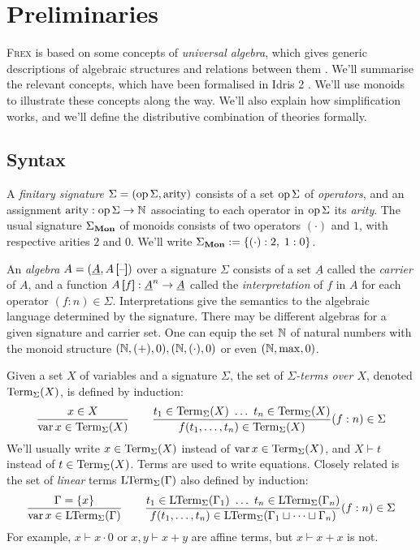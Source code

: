 \section{Preliminaries}
\label{sec:preliminaries}

\textsc{Frex} is based on some concepts of \emph{universal algebra}, which gives generic descriptions of algebraic structures and relations between them \parencite[][Chp. II]{universal_algebra}. We'll summarise the relevant concepts, which have been formalised in Idris 2 \parencite{idris_frex}. We'll use monoids to illustrate these concepts along the way. We'll also explain how simplification works, and we'll define the distributive combination of theories formally.

\subsection{Syntax}

A \emph{finitary signature} $\Sigma = (\operatorname{op} \Sigma, \operatorname{arity})$ consists of a set $\operatorname{op} \Sigma$ of \emph{operators}, and an assignment $\operatorname{arity} : \operatorname{op} \Sigma \to \mathbb N$ associating to each operator in $\operatorname{op} \Sigma$ its \emph{arity}. The usual signature $\Sigma_{\mathbf{Mon}}$ of monoids consists of two operators $(\cdot)$ and $1$, with respective arities $2$ and $0$. We'll write $\Sigma_{\mathbf{Mon}} := \{(\cdot) : 2,\; 1 : 0\}$.

An \emph{algebra} $A = (\underline{A}, A \left[\!\!\!\:\left[ \text{--} \right]\!\!\!\:\right])$ over a signature $\Sigma$ consists of a set $\underline{A}$ called the \emph{carrier} of $A$, and a function $A \left[\!\!\!\:\left[ f \right]\!\!\!\:\right] : \underline{A}^n \to \underline{A}$ called the \emph{interpretation} of $f$ in $A$ for each operator $(f : n) \in \Sigma$. Interpretations give the semantics to the algebraic language determined by the signature. There may be different algebras for a given signature and carrier set. One can equip the set $\mathbb N$ of natural numbers with the monoid structure $(\mathbb N, (+), 0), (\mathbb N, (\cdot), 0)$ or even $(\mathbb N, \max, 0)$.

Given a set $X$ of variables and a signature $\Sigma$, the set of \emph{$\Sigma$-terms over $X$}, denoted $\operatorname{Term}_\Sigma(X)$, is defined by induction:
$$\dfrac{x \in X}{\operatorname{var} x \in \operatorname{Term}_\Sigma(X)} \qquad \dfrac{t_1 \in \operatorname{Term}_\Sigma(X)\ \ldots\ t_n \in \operatorname{Term}_\Sigma(X)}{f(t_1, \dots, t_n) \in \operatorname{Term}_\Sigma(X)}(f : n) \in \Sigma$$
\noindent We'll usually write $x \in \operatorname{Term}_\Sigma(X)$ instead of $\operatorname{var} x \in \operatorname{Term}_\Sigma(X)$, and $X \vdash t$ instead of $t \in \operatorname{Term}_\Sigma(X)$. Terms are used to write equations.
Closely related is the set of \emph{linear} terms $\operatorname{LTerm}_\Sigma(\Gamma)$ also defined by induction:
$$\dfrac{\Gamma = \{x\}}{\operatorname{var} x \in \operatorname{LTerm}_\Sigma(\Gamma)} \qquad \dfrac{t_1 \in \operatorname{LTerm}_\Sigma(\Gamma_1)\ \ldots\  t_n \in \operatorname{LTerm}_\Sigma(\Gamma_n)}{f(t_1, \dots, t_n) \in \operatorname{LTerm}_\Sigma(\Gamma_1 \sqcup \dots \sqcup \Gamma_n)}(f : n) \in \Sigma$$ For example, $x \vdash x \cdot 0$ or $x, y \vdash x + y$ are affine terms, but $x \vdash x + x$ is not.


